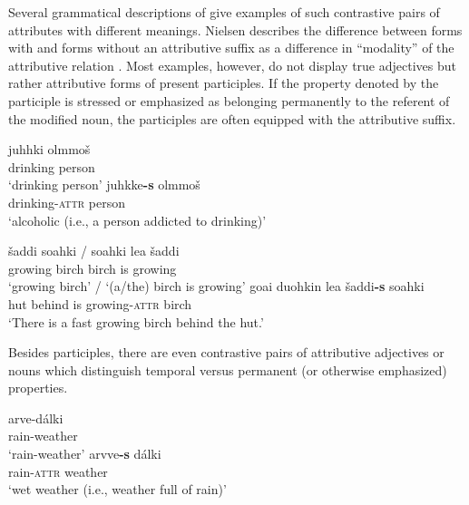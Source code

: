 {Several grammatical descriptions of  give examples of such contrastive pairs of attributes with different meanings. Nielsen describes the difference between forms with and forms without an attributive suffix as a difference in “modality” of the attributive relation \citep[203]{nielsen1945b}. Most examples, however, do not display true adjectives but rather attributive forms of present participles. If the property denoted by the participle is stressed or emphasized as belonging permanently to the referent of the modified noun, the participles are often equipped with the attributive suffix.
\begin{exe}
\ex
\begin{xlist}
\begin{xlist}
\ex
\gll 	juhhki olmmoš\\
	drinking person\\
\glt	 ‘drinking person’
\ex	
\gll	juhkke\textbf{-s} olmmoš\\
	drinking-\textsc{attr} person\\
\glt	‘alcoholic (i.e., a person addicted to drinking)’
\end{xlist}

\newpage 

\begin{xlist}
\ex 	
\gll	šaddi soahki / soahki lea šaddi\\
 	growing birch {} birch is growing\\
\glt	‘growing birch’ / ‘(a/the) birch is growing’
\ex
\gll	goa{\dj}i duohkin lea šaddi\textbf{-s} soahki\\
	hut behind is growing-\textsc{attr} birch\\
\glt	‘There is a fast growing birch behind the hut.’
\end{xlist}
\end{xlist}
\end{exe}

Besides participles, there are even contrastive pairs of attributive adjectives or nouns which distinguish temporal versus permanent (or otherwise emphasized) properties.
\begin{exe}
\ex
\begin{xlist}
\begin{xlist}
\ex
\gll	arve-dálki\\
	rain-weather\\
\glt	‘rain-weather’
\ex
\gll	arvve\textbf{-s} dálki\\
	rain-\textsc{attr} weather\\
\glt	‘wet weather (i.e., weather full of rain)’
\end{xlist}
\end{xlist}
\end{exe}

}

